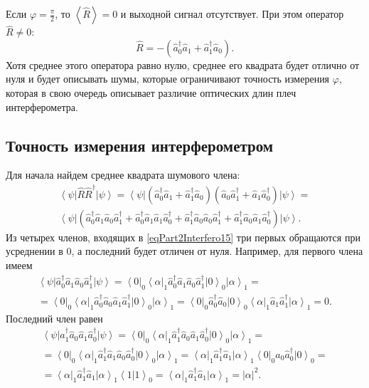 Если $\varphi = \frac{\pi}{2}$, то $\left<\hat{R}\right> = 0$ и
выходной сигнал отсутствует. При этом оператор $\hat{R} \ne 0$:
\[
\hat{R} = 
-
\left(
\hat{a}_0^{\dag} \hat{a}_1 + 
\hat{a}_1^{\dag} \hat{a}_0
\right).
\]
Хотя среднее этого оператора равно нулю, среднее его квадрата будет
отлично от нуля и будет описывать шумы, которые ограничивают точность
измерения $\varphi$, которая в свою очередь описывает различие
оптических длин плеч интерферометра.

\subsection{Точность измерения интерферометром}

Для начала найдем среднее квадрата шумового члена:
\begin{eqnarray}
\left<\psi\right|\hat{R}\hat{R}^{\dag}\left|\psi\right> = 
\left<\psi\right|
\left(
\hat{a}_0^{\dag} \hat{a}_1 + 
\hat{a}_1^{\dag} \hat{a}_0
\right)
\left(
\hat{a}_0 \hat{a}_1^{\dag} +
\hat{a}_1 \hat{a}_0^{\dag}
\right)
\left|\psi\right> = 
\nonumber \\
\left<\psi\right|
\left(
\hat{a}_0^{\dag} \hat{a}_1 
\hat{a}_0 \hat{a}_1^{\dag} 
+ 
\hat{a}_0^{\dag} \hat{a}_1 
\hat{a}_1 \hat{a}_0^{\dag}
+
\hat{a}_1^{\dag} \hat{a}_0
\hat{a}_0 \hat{a}_1^{\dag} 
+
\hat{a}_1^{\dag} \hat{a}_0
\hat{a}_1 \hat{a}_0^{\dag}
\right)
\left|\psi\right>.
\label{eqPart2Interfero15}
\end{eqnarray}
Из четырех членов, входящих в \eqref{eqPart2Interfero15} три первых
обращаются при усреднении в 0, а последний будет отличен от нуля.
Например, для первого члена имеем
\begin{eqnarray}
\left<\psi\right|
\hat{a}_0^{\dag} \hat{a}_1 
\hat{a}_0 \hat{a}_1^{\dag} 
\left|\psi\right> = 
\left<0\right|_0\left<\alpha\right|_1
\hat{a}_0^{\dag} \hat{a}_1 
\hat{a}_0 \hat{a}_1^{\dag} 
\left|0\right>_0\left|\alpha\right>_1 =
\nonumber \\
=
\left<0\right|_0\left<\alpha\right|_1
\hat{a}_0^{\dag} \hat{a}_0 
\hat{a}_1 \hat{a}_1^{\dag} 
\left|0\right>_0\left|\alpha\right>_1 =
\left<0\right|_0
\hat{a}_0^{\dag} \hat{a}_0 
\left|0\right>_0
\left<\alpha\right|_1
\hat{a}_1 \hat{a}_1^{\dag} 
\left|\alpha\right>_1 =
0.
\nonumber
\end{eqnarray}
Последний член равен
\begin{eqnarray}
\left<\psi\right|
\hat{a}_1^{\dag} \hat{a}_0
\hat{a}_1 \hat{a}_0^{\dag}
\left|\psi\right> = 
\left<0\right|_0\left<\alpha\right|_1
\hat{a}_1^{\dag} \hat{a}_0
\hat{a}_1 \hat{a}_0^{\dag}
\left|0\right>_0\left|\alpha\right>_1 =
\nonumber \\
=
\left<0\right|_0\left<\alpha\right|_1
\hat{a}_1^{\dag} \hat{a}_1 
\hat{a}_0 \hat{a}_0^{\dag}
\left|0\right>_0\left|\alpha\right>_1 =
\left<\alpha\right|_1
\hat{a}_1^{\dag} \hat{a}_1 
\left|\alpha\right>_1 
\left<0\right|_0
\hat{a}_0 \hat{a}_0^{\dag}
\left|0\right>_0 =
\nonumber \\
=
\left<\alpha\right|_1
\hat{a}_1^{\dag} \hat{a}_1 
\left|\alpha\right>_1 
\left<1\right.
\left|1\right>_0 =
\left<\alpha\right|_1
\hat{a}_1^{\dag} \hat{a}_1 
\left|\alpha\right>_1 
= \left|\alpha\right|^2.
\end{eqnarray}
